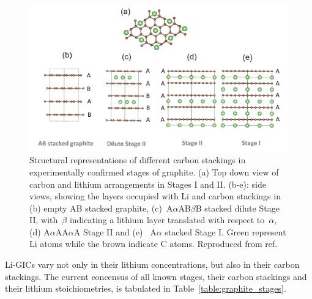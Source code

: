 \documentclass[../main.tex]{subfiles}
\begin{document}
\begin{figure}[h!]
    \begin{center}
    \includegraphics[width=0.98\columnwidth]{figures/stages_version4}
    \caption{{{Structural representations of different carbon stackings in
    experimentally confirmed stages of graphite. (a) Top down view of carbon
    and lithium arrangements in Stages I and II. (b-e): side views, showing
    the layers occupied with Li and carbon stackings in (b) empty AB stacked
    graphite, (c)~A\(\alpha\)AB\(\beta\)B stacked dilute
    Stage II, with~\(\beta\) indicating a lithium layer translated
    with respect to~\(\alpha\), (d)
    A\(\alpha\)AA\(\alpha\)A Stage II and (e)~
    A\(\alpha\) stacked Stage I}{. Green represent Li atoms while
    the brown indicate C atoms. Reproduced from ref. \cite{Mercer2021}}
    {\label{fig:graphite_stages_schematics}}%
    }}
    \end{center}
\end{figure}

Li-GICs vary not only in their lithium concentrations, but also in their carbon stackings. The current concensus of all known stages, their carbon stackings and their lithium stoichiometries, is tabulated in Table~\ref{table:graphite_stages}.
\end{document}
